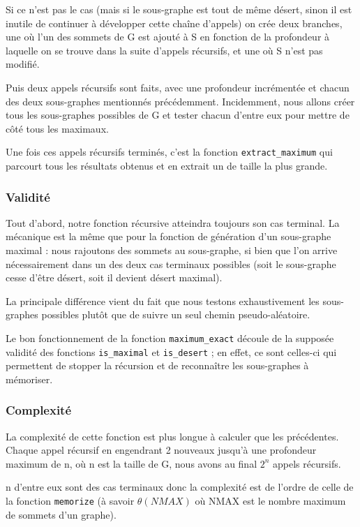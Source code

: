 Si ce n'est pas le cas (mais si le sous-graphe est tout de même désert, sinon il est inutile de continuer à développer cette chaîne d'appels) on crée deux branches, une où l'un des sommets de G est ajouté à S en fonction de la profondeur à laquelle on se trouve dans la suite d'appels récursifs, et une où S n'est pas modifié. 

Puis deux appels récursifs sont faits, avec une profondeur incrémentée et chacun des deux sous-graphes mentionnés précédemment. Incidemment, nous allons créer tous les sous-graphes possibles de G et tester chacun d'entre eux pour mettre de côté tous les maximaux.

Une fois ces appels récursifs terminés, c'est la fonction \verb|extract_maximum| qui parcourt tous les résultats obtenus et en extrait un de taille la plus grande. 

\subsubsection{Validité}

Tout d'abord, notre fonction récursive atteindra toujours son cas terminal. La mécanique est la même que pour la fonction de génération d'un sous-graphe maximal : nous rajoutons des sommets au sous-graphe, si bien que l'on arrive nécessairement dans un des deux cas terminaux  possibles (soit le sous-graphe cesse d'être désert, soit il devient désert maximal). 

La principale différence vient du fait que nous testons exhaustivement les sous-graphes possibles plutôt que de suivre un seul chemin  pseudo-aléatoire. 

Le bon fonctionnement de la fonction \verb|maximum_exact| découle de la supposée validité des fonctions \verb|is_maximal| et \verb|is_desert| ; en effet, ce sont celles-ci qui permettent de stopper la récursion et de reconnaître les sous-graphes à mémoriser. 

\subsubsection{Complexité}

La complexité de cette fonction est plus longue à calculer que les précédentes. Chaque appel récursif en engendrant 2 nouveaux jusqu'à une profondeur maximum de n, où n est la taille de G, nous avons au final $2^n$ appels récursifs. 

n d'entre eux sont des cas terminaux donc la complexité est de l'ordre de celle de la fonction \verb|memorize| (à savoir $\theta(NMAX)$ où NMAX est le nombre maximum de sommets d'un graphe).

